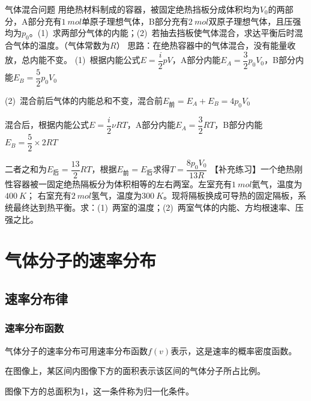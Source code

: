 \begin{example}{气体混合问题}
    用绝热材料制成的容器，被固定绝热挡板分成体积均为$V_0$的两部分，A部分充有$\SI{1}{mol}$单原子理想气体，B部分充有$\SI{2}{mol}$双原子理想气体，且压强均为$p_0$。(1)~求两部分气体的内能；(2)~若抽去挡板使气体混合，求达平衡后时混合气体的温度。（气体常数为$R$）
    \tcblower
    {\fangsong 思路：在绝热容器中的气体混合，没有能量收放，总内能不变。}
    \tcbline
    (1)~根据内能公式$E=\dfrac{i}{2}pV$，A部分内能$E_A=\dfrac{3}{2}p_0V_0$，B部分内能$E_B=\dfrac{5}{2}p_0V_0$

    \vspace{0.3em}
    
    (2)~混合前后气体的内能总和不变，混合前$E_{\text{前}}=E_A+E_B=4p_0V_0$

    \vspace{0.3em}
    
    混合后，根据内能公式$E=\dfrac{i}{2}\nu RT$，A部分内能$E_A=\dfrac{3}{2}RT$，B部分内能$E_B=\dfrac{5}{2}\times 2RT$

    \vspace{0.5em}

    二者之和为$E_{\text{后}}=\dfrac{13}{2}RT$，根据$E_{\text{前}}=E_{\text{后}}$求得$T=\dfrac{8p_0V_0}{13R}$
    \tcbline
    【补充练习】一个绝热刚性容器被一固定绝热隔板分为体积相等的左右两室。左室充有$\SI{1}{mol}$氦气，温度为$\SI{400}{K}$；
    右室充有$\SI{2}{mol}$氢气，温度为$\SI{300}{K}$。现将隔板换成可导热的固定隔板，系统最终达到热平衡。求：(1)~两室的温度；(2)~两室气体的内能、方均根速率、压强之比。
\end{example}

\section{气体分子的速率分布}

\subsection{速率分布律}

\subsubsection{速率分布函数}

气体分子的速率分布可用速率分布函数$f(v)$表示，这是速率的概率密度函数。

在图像上，某区间内图像下方的面积表示该区间的气体分子所占比例。

图像下方的总面积为1，这一条件称为归一化条件。

